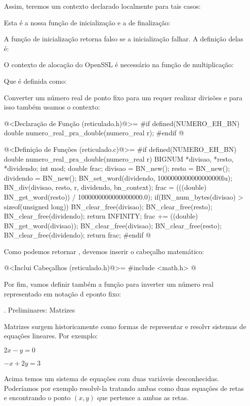 Assim, teremos um contexto declarado localmente para tais casos:


Esta é a nossa função de inicialização e a de finalização:


A função de inicialização retorna falso se a inicialização falhar. A
definição delas é:


O contexto de alocação do OpenSSL é necessário na função de
multiplicação:


Que é definida como:


Converter um número real de ponto fixo para um 
requer realizar divisões e para isso também usamos o contexto:

\iniciocodigo
@<Declaração de Função (reticulado.h)@>=
#if defined(NUMERO_EH_BN)
double numero_real_pra_double(numero_real r);
#endif
@
\fimcodigo

\iniciocodigo
@<Definição de Funções (reticulado.c)@>=
#if defined(NUMERO_EH_BN)
double numero_real_pra_double(numero_real r){
  BIGNUM *divisao, *resto, *dividendo;
  int mod;
  double frac;
  divisao = BN_new();
  resto = BN_new();
  dividendo = BN_new();
  BN_set_word(dividendo, 1000000000000000000lu);  
  BN_div(divisao, resto, r, dividendo, bn_context);
  frac = (((double) BN_get_word(resto)) / 1000000000000000000.0);
  if(BN_num_bytes(divisao) > sizeof(unsigned long)){
    BN_clear_free(divisao);
    BN_clear_free(resto);
    BN_clear_free(dividendo);
    return INFINITY;
  }
  frac += ((double) BN_get_word(divisao));
  BN_clear_free(divisao);
  BN_clear_free(resto);
  BN_clear_free(dividendo);
  return frac;  
}
#endif
@

Como podemos retornar , devemos inserir o
cabeçalho matemático:

\iniciocodigo
@<Inclui Cabeçalhos (reticulado.h)@>=
#include <math.h>
@
\fimcodigo

Por fim, vamos definir também a função para inverter um número real
representado em notação d eponto fixo:



{\twelvebold {}. Preliminares: Matrizes}

Matrizes surgem historicamente como formas de representar e resolvr
sistemas de equações lineares. Por exemplo:

$2x-y=0$

$-x+2y=3$

Acima temos um sistema de equações com duas variáveis
desconhecidas. Poderíamos por exemplo resolvê-la tratando ambas como
duas equações de retas e encontrando o ponto $(x, y)$ que pertence a
ambas as retas.

